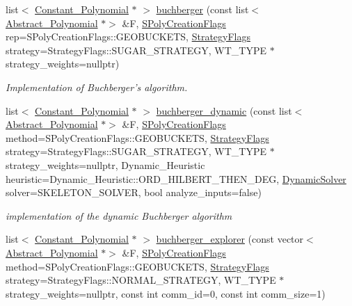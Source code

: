 \begin{DoxyCompactItemize}
\item 
list$<$ \hyperlink{group__polygroup_class_constant___polynomial}{Constant\+\_\+\+Polynomial} $\ast$ $>$ \hyperlink{group___g_b_computation_ga37aa7e2fec96fac6c914934a4243f603}{buchberger} (const list$<$ \hyperlink{group__polygroup_class_abstract___polynomial}{Abstract\+\_\+\+Polynomial} $\ast$$>$ \&F, \hyperlink{group___g_b_computation_ga73257b8a2d5cc826853a71b77d0cebf2}{S\+Poly\+Creation\+Flags} rep=S\+Poly\+Creation\+Flags\+::\+G\+E\+O\+B\+U\+C\+K\+E\+TS, \hyperlink{group__strategygroup_ga0ee6c8e033547330e6b89929730007f4}{Strategy\+Flags} strategy=Strategy\+Flags\+::\+S\+U\+G\+A\+R\+\_\+\+S\+T\+R\+A\+T\+E\+GY, W\+T\+\_\+\+T\+Y\+PE $\ast$strategy\+\_\+weights=nullptr)
\begin{DoxyCompactList}\small\item\em Implementation of Buchberger's algorithm. \end{DoxyCompactList}\item 
list$<$ \hyperlink{group__polygroup_class_constant___polynomial}{Constant\+\_\+\+Polynomial} $\ast$ $>$ \hyperlink{group___g_b_computation_ga2c05f4e2ea8b43bb696483469f4cce83}{buchberger\+\_\+dynamic} (const list$<$ \hyperlink{group__polygroup_class_abstract___polynomial}{Abstract\+\_\+\+Polynomial} $\ast$$>$ \&F, \hyperlink{group___g_b_computation_ga73257b8a2d5cc826853a71b77d0cebf2}{S\+Poly\+Creation\+Flags} method=S\+Poly\+Creation\+Flags\+::\+G\+E\+O\+B\+U\+C\+K\+E\+TS, \hyperlink{group__strategygroup_ga0ee6c8e033547330e6b89929730007f4}{Strategy\+Flags} strategy=Strategy\+Flags\+::\+S\+U\+G\+A\+R\+\_\+\+S\+T\+R\+A\+T\+E\+GY, W\+T\+\_\+\+T\+Y\+PE $\ast$strategy\+\_\+weights=nullptr, Dynamic\+\_\+\+Heuristic heuristic=Dynamic\+\_\+\+Heuristic\+::\+O\+R\+D\+\_\+\+H\+I\+L\+B\+E\+R\+T\+\_\+\+T\+H\+E\+N\+\_\+\+D\+EG, \hyperlink{group___g_b_computation_ga28fbbb9eb7d8b80ced05c8fa89b2bdac}{Dynamic\+Solver} solver=S\+K\+E\+L\+E\+T\+O\+N\+\_\+\+S\+O\+L\+V\+ER, bool analyze\+\_\+inputs=false)
\begin{DoxyCompactList}\small\item\em implementation of the dynamic Buchberger algorithm \end{DoxyCompactList}\item 
list$<$ \hyperlink{group__polygroup_class_constant___polynomial}{Constant\+\_\+\+Polynomial} $\ast$ $>$ \hyperlink{group___g_b_computation_gaaaca5a3659aba7d4b3a41e253dc1a60f}{buchberger\+\_\+explorer} (const vector$<$ \hyperlink{group__polygroup_class_abstract___polynomial}{Abstract\+\_\+\+Polynomial} $\ast$$>$ \&F, \hyperlink{group___g_b_computation_ga73257b8a2d5cc826853a71b77d0cebf2}{S\+Poly\+Creation\+Flags} method=S\+Poly\+Creation\+Flags\+::\+G\+E\+O\+B\+U\+C\+K\+E\+TS, \hyperlink{group__strategygroup_ga0ee6c8e033547330e6b89929730007f4}{Strategy\+Flags} strategy=Strategy\+Flags\+::\+N\+O\+R\+M\+A\+L\+\_\+\+S\+T\+R\+A\+T\+E\+GY, W\+T\+\_\+\+T\+Y\+PE $\ast$strategy\+\_\+weights=nullptr, const int comm\+\_\+id=0, const int comm\+\_\+size=1)
$$
\end{DoxyCompactItemize}
